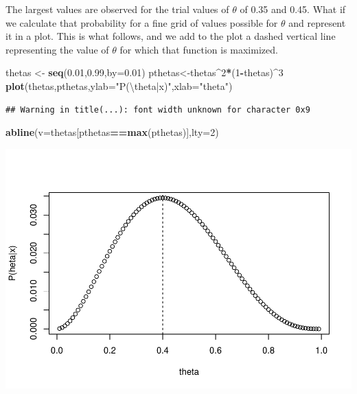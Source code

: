 \documentclass[
]{book}
\newenvironment{Shaded}{\begin{snugshade}}{\end{snugshade}}
\newcommand{\CharTok}[1]{\textcolor[rgb]{0.31,0.60,0.02}{#1}}
\newcommand{\DataTypeTok}[1]{\textcolor[rgb]{0.13,0.29,0.53}{#1}}
\newcommand{\DecValTok}[1]{\textcolor[rgb]{0.00,0.00,0.81}{#1}}
\newcommand{\FloatTok}[1]{\textcolor[rgb]{0.00,0.00,0.81}{#1}}
\newcommand{\KeywordTok}[1]{\textcolor[rgb]{0.13,0.29,0.53}{\textbf{#1}}}
\newcommand{\NormalTok}[1]{#1}
\newcommand{\OperatorTok}[1]{\textcolor[rgb]{0.81,0.36,0.00}{\textbf{#1}}}
\newcommand{\StringTok}[1]{\textcolor[rgb]{0.31,0.60,0.02}{#1}}
\begin{document}
The largest values are observed for the trial values of \(\theta\) of 0.35 and 0.45. What if we calculate that probability for a fine grid of values possible for \(\theta\) and represent it in a plot. This is what follows, and we add to the plot a dashed vertical line representing the value of \(\theta\) for which that function is maximized.

\begin{Shaded}
\begin{Highlighting}[]
\NormalTok{thetas <-}\StringTok{ }\KeywordTok{seq}\NormalTok{(}\FloatTok{0.01}\NormalTok{,}\FloatTok{0.99}\NormalTok{,}\DataTypeTok{by=}\FloatTok{0.01}\NormalTok{)}
\NormalTok{pthetas<-thetas}\OperatorTok{^}\DecValTok{2}\OperatorTok{*}\NormalTok{(}\DecValTok{1}\OperatorTok{-}\NormalTok{thetas)}\OperatorTok{^}\DecValTok{3}
\KeywordTok{plot}\NormalTok{(thetas,pthetas,}\DataTypeTok{ylab=}\StringTok{"P(}\CharTok{\textbackslash{}t}\StringTok{heta|x)"}\NormalTok{,}\DataTypeTok{xlab=}\StringTok{"theta"}\NormalTok{)}
\end{Highlighting}
\end{Shaded}

\begin{verbatim}
## Warning in title(...): font width unknown for character 0x9
\end{verbatim}

\begin{Shaded}
\begin{Highlighting}[]
\KeywordTok{abline}\NormalTok{(}\DataTypeTok{v=}\NormalTok{thetas[pthetas}\OperatorTok{==}\KeywordTok{max}\NormalTok{(pthetas)],}\DataTypeTok{lty=}\DecValTok{2}\NormalTok{)}
\end{Highlighting}
\end{Shaded}

\includegraphics{ECOMODbook_files/figure-latex/ch13.3-1.pdf}
\end{document}
